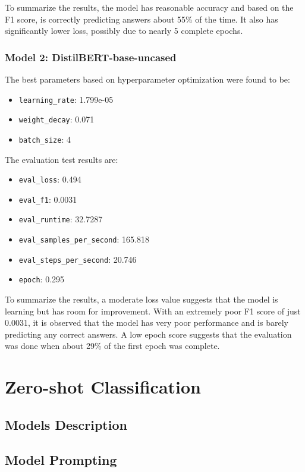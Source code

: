 \documentclass[titlepage]{article}
\begin{document}
To summarize the results, the model has reasonable accuracy and based on the F1 score, is correctly predicting 
answers about 55\% of the time. It also has significantly lower loss, possibly due to nearly 5 complete epochs.


\subsubsection{Model 2: DistilBERT-base-uncased}
The best parameters based on hyperparameter optimization were found to be:
\begin{itemize}
    \item \texttt{learning\_rate}: 1.799e-05
    \item \texttt{weight\_decay}: 0.071
    \item \texttt{batch\_size}: 4
\end{itemize}

The evaluation test results are:
\begin{itemize}
    \item \texttt{eval\_loss}: 0.494
    \item \texttt{eval\_f1}: 0.0031
    \item \texttt{eval\_runtime}: 32.7287
    \item \texttt{eval\_samples\_per\_second}: 165.818
    \item \texttt{eval\_steps\_per\_second}: 20.746
    \item \texttt{epoch}: 0.295
\end{itemize}

To summarize the results, a moderate loss value suggests that the model is learning but has room 
for improvement. With an extremely poor F1 score of just 0.0031, it is observed that the model has very 
poor performance and is barely predicting any correct answers. A low epoch score suggests that the evaluation 
was done when about 29\% of the first epoch was complete.

\section{Zero-shot Classification}

\subsection{Models Description}

\subsection{Model Prompting}
\end{document}
